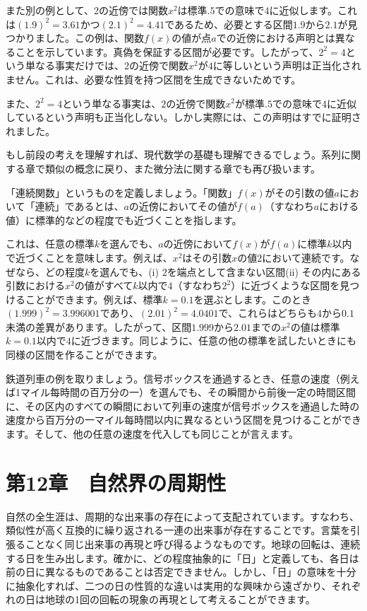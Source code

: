 \documentclass[a4paper,11pt,openany]{ltjsbook}
\begin{document}
また別の例として、$2$の近傍では関数$x^2$は標準$.5$での意味で$4$に近似します。これは$(1.9)^2=3.61$かつ$(2.1)^2=4.41$であるため、必要とする区間$1.9$から$2.1$が見つかりました。この例は、関数$f(x)$の値が点$a$での近傍における声明とは異なることを示しています。真偽を保証する区間が必要です。したがって、$2^2=4$という単なる事実だけでは、$2$の近傍で関数$x^2$が$4$に等しいという声明は正当化されません。これは、必要な性質を持つ区間を生成できないためです。

また、$2^2=4$という単なる事実は、$2$の近傍で関数$x^2$が標準$.5$での意味で$4$に近似しているという声明も正当化しない。しかし実際には、この声明はすでに証明されました。

もし前段の考えを理解すれば、現代数学の基礎も理解できるでしょう。系列に関する章で類似の概念に戻り、また微分法に関する章でも再び扱います。

「連続関数」というものを定義しましょう。「関数」$f(x)$がその引数の値$a$において「連続」であるとは、$a$の近傍においてその値が$f(a)$（すなわち$a$における値）に標準的などの程度でも近づくことを指します。

これは、任意の標準$k$を選んでも、$a$の近傍において$f(x)$が$f(a)$に標準$k$以内で近づくことを意味します。例えば、$x^2$はその引数$x$の値$2$において連続です。なぜなら、どの程度$k$を選んでも、(i) $2$を端点として含まない区間(ii) その内にある引数における$x^2$の値がすべて$k$以内で$4$（すなわち$2^2$）に近づくような区間を見つけることができます。例えば、標準$k = 0.1$を選ぶとします。このとき$(1.999)^2 = 3.996001$であり、$(2.01)^2 = 4.0401$で、これらはどちらも$4$から$0.1$未満の差異があります。したがって、区間$1.999$から$2.01$までの$x^2$の値は標準$k = 0.1$以内で$4$に近づきます。同じように、任意の他の標準を試したいときにも同様の区間を作ることができます。

鉄道列車の例を取りましょう。信号ボックスを通過するとき、任意の速度（例えば1マイル每時間の百万分の一）を選んでも、その瞬間から前後一定の時間区間に、その区内のすべての瞬間において列車の速度が信号ボックスを通過した時の速度から百万分の一マイル每時間以内に異なるという区間を見つけることができます。そして、他の任意の速度を代入しても同じことが言えます。

\chapter{第12章　自然界の周期性}

自然の全生涯は、周期的な出来事の存在によって支配されています。すなわち、類似性が高く互換的に繰り返される一連の出来事が存在することです。言葉を引張ることなく同じ出来事の再現と呼び得るようなものです。地球の回転は、連続する日を生み出します。確かに、どの程度抽象的に「日」と定義しても、各日は前の日に異なるものであることは否定できません。しかし、「日」の意味を十分に抽象化すれば、二つの日の性質的な違いは実用的な興味から遠ざかり、それぞれの日は地球の1回の回転の現象の再現として考えることができます。
\end{document}
